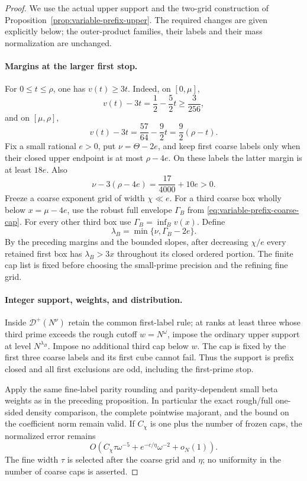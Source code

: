 \begin{proof}
We use the actual upper support and the two-grid construction of
Proposition~\ref{prop:variable-prefix-upper}. The required changes
are given explicitly below; the outer-product families, their
labels and their mass normalization are unchanged.

\paragraph{Margins at the larger first stop.}
For $0\le t\le\rho$, one has $v(t)\ge3t$. Indeed,
on $[0,\mu]$,
\[
 v(t)-3t=\frac12-\frac52t\ge\frac3{256},
\]
and on $[\mu,\rho]$,
\[
 v(t)-3t=\frac{57}{64}-\frac92t
                   =\frac92(\rho-t).
\]
Fix a small rational $e>0$, put $\nu=\Theta-2e$, and keep
first coarse labels only when their closed upper endpoint is
at most $\rho-4e$. On these labels the latter margin is at least
$18e$. Also
\[
 \nu-3(\rho-4e)=\frac{17}{4000}+10e>0.
\]
Freeze a coarse exponent grid of width $\chi\ll e$. For a
third coarse box wholly below $x=\mu-4e$, use the robust full
envelope $\Gamma_B$ from
\eqref{eq:variable-prefix-coarse-cap}. For every other third box
use $\Gamma_B=\inf_B v(x)$. Define
\[
 \lambda_B=\min\{\nu,\Gamma_B-2e\}.
\]
By the preceding margins and the bounded slopes, after decreasing
$\chi/e$ every retained first box has
$\lambda_B>3x$ throughout its closed ordered portion.
The finite cap list is fixed before choosing the small-prime
precision and the refining fine grid.

\paragraph{Integer support, weights, and distribution.}
Inside $\mathcal D^+(N^\nu)$ retain the common first-label rule;
at ranks at least three whose third prime exceeds the rough
cutoff $w=N^\omega$, impose the ordinary upper support at
level $N^{\lambda_B}$. Impose no additional third cap below $w$.
The cap is fixed by the first three coarse labels and its first
cube cannot fail. Thus the support is prefix closed and all
first exclusions are odd, including the first-prime stop.

Apply the same fine-label parity rounding and parity-dependent
small beta weights as in the preceding proposition. In particular
the exact rough/full one-sided density comparison, the complete
pointwise majorant, and the bound on the coefficient norm remain
valid. If $C_\chi$ is one plus the number of frozen caps, the
normalized error remains
\[
 O(C_\chi\tau\omega^{-5}
                 +e^{-c/\eta}\omega^{-2}+o_N(1)).
\]
The fine width $\tau$ is selected after the coarse grid and
$\eta$; no uniformity in the number of coarse caps is asserted.


\end{proof}
